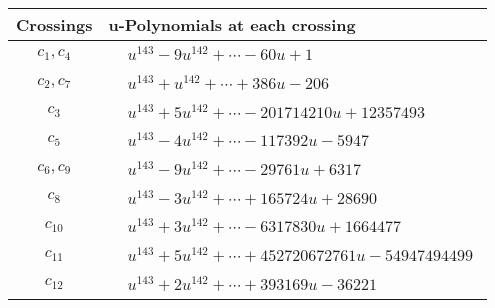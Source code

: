 \documentclass[1p]{elsarticle_modified}
\theoremstyle{definition}
\begin{document}
\begin{tabular}{m{50pt}|m{274pt}}
Crossings & \hspace{64pt}u-Polynomials at each crossing \\
\hline $$\begin{aligned}c_{1},c_{4}\end{aligned}$$&$\begin{aligned}
&u^{143}-9 u^{142}+\cdots-60 u+1
\end{aligned}$\\
\hline $$\begin{aligned}c_{2},c_{7}\end{aligned}$$&$\begin{aligned}
&u^{143}+u^{142}+\cdots+386 u-206
\end{aligned}$\\
\hline $$\begin{aligned}c_{3}\end{aligned}$$&$\begin{aligned}
&u^{143}+5 u^{142}+\cdots-201714210 u+12357493
\end{aligned}$\\
\hline $$\begin{aligned}c_{5}\end{aligned}$$&$\begin{aligned}
&u^{143}-4 u^{142}+\cdots-117392 u-5947
\end{aligned}$\\
\hline $$\begin{aligned}c_{6},c_{9}\end{aligned}$$&$\begin{aligned}
&u^{143}-9 u^{142}+\cdots-29761 u+6317
\end{aligned}$\\
\hline $$\begin{aligned}c_{8}\end{aligned}$$&$\begin{aligned}
&u^{143}-3 u^{142}+\cdots+165724 u+28690
\end{aligned}$\\
\hline $$\begin{aligned}c_{10}\end{aligned}$$&$\begin{aligned}
&u^{143}+3 u^{142}+\cdots-6317830 u+1664477
\end{aligned}$\\
\hline $$\begin{aligned}c_{11}\end{aligned}$$&$\begin{aligned}
&u^{143}+5 u^{142}+\cdots+452720672761 u-54947494499
\end{aligned}$\\
\hline $$\begin{aligned}c_{12}\end{aligned}$$&$\begin{aligned}
&u^{143}+2 u^{142}+\cdots+393169 u-36221
\end{aligned}$\\
\hline
\end{tabular}\\~\\
\end{document}
